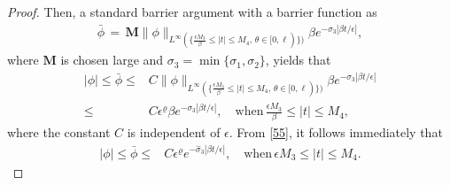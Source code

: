 \documentclass[10pt, reqno]{amsart}
\numberwithin{equation}{section}
\theoremstyle{definition}
\newcommand{\e}{\epsilon}
\begin{document}
{{\begin{proof}
 Then, a standard barrier argument with a barrier function as
\begin{align*}
 \bar \phi \,=\, \mathbf{M}  \|\phi \|_{L^\infty (\{\frac {\e M_3} {\beta}\leq |t|\leq M_4,\, \theta\in [0, \ell)\}) } \beta e^{-\sigma_3 |\beta t/\epsilon| },
\end{align*}
 where $\mathbf{M}$ is chosen large and $\sigma_3=\min\{\sigma_1, \sigma_2\}$, yields that
\begin{align}\label{55}
 |\phi |\leq \bar \phi\leq&C  \|\phi \|_{L^\infty (\{\frac {\e M_3} {\beta}\leq |t|\leq M_4,\, \theta\in [0, \ell)\}) }\beta e^{-\sigma_3 |\beta t/\epsilon| }\nonumber
 \\[2mm]
 \leq&  C \epsilon^\varrho \beta e^{-\sigma_3 |\beta t/\epsilon| }, \quad \text{when}\, \frac {\e M_3} {\beta}\leq |t|\leq M_4,
\end{align}
 where the constant $C$ is independent of $\epsilon$.   From \eqref{55}, it follows immediately that
 \begin{align}
 |\phi |\leq \bar \phi\leq&  C \epsilon^\varrho e^{-\hat{\sigma}_3 |\beta t/\epsilon| },    \quad \text{when}\, \e M_3\leq |t|\leq M_4.
 \end{align}



\end{proof}}}
\end{document}
